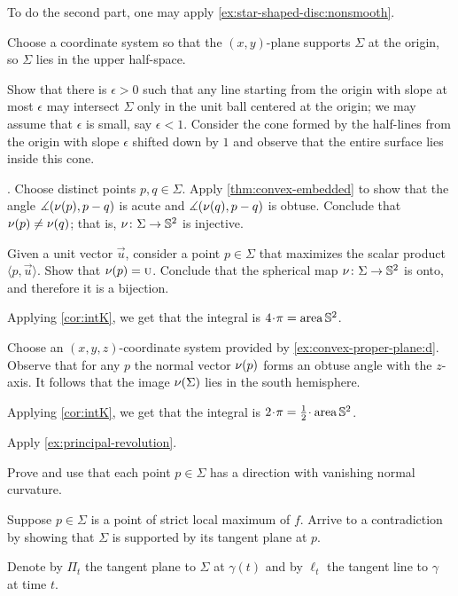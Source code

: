 To do the second part, one may apply \ref{ex:star-shaped-disc:nonsmooth}.


Choose a coordinate system so that the $(x,y)$-plane supports $\Sigma$ at the origin, so $\Sigma$ lies in the upper half-space.

Show that there is $\epsilon>0$ such that any line starting from the origin with slope at most $\epsilon$ may intersect $\Sigma$ only in the unit ball centered at the origin;
we may assume that $\epsilon$ is small, say $\epsilon<1$.
Consider the cone formed by the half-lines from the origin with slope $\epsilon$ shifted down by $1$ and observe that the entire surface lies inside this cone.



\parbf{\ref{ex:intK}}.
Choose distinct points $p,q\in\Sigma$.
Apply \ref{thm:convex-embedded} to show that the angle 
$\measuredangle(\nu(p),p-q)$ is acute and $\measuredangle(\nu(q),p-q)$ is obtuse.
Conclude that $\nu(p)\ne\nu(q)$;
that is, $\nu\colon\Sigma\to\mathbb{S}^2$ is injective.


Given a unit vector $\vec u$, consider a point $p\in \Sigma$ that maximizes the scalar product $\langle p,\vec u\rangle$.
Show that $\nu(p)=\text{\sc{u}}$.
Conclude that the spherical map $\nu\colon\Sigma\to\mathbb{S}^2$ is onto, and therefore it is a bijection.

Applying \ref{cor:intK}, we get that the integral is $4\cdot\pi=\area\mathbb{S}^2$.

 Choose an $(x,y,z)$-coordinate system provided by \ref{ex:convex-proper-plane:d}.
Observe that for any $p$ the normal vector $\nu(p)$ forms an obtuse angle with the $z$-axis.
It follows that the image $\nu(\Sigma)$ lies in the south hemisphere.

Applying \ref{cor:intK}, we get that the integral is $2\cdot\pi=\tfrac12\cdot\area\mathbb{S}^2$.

Apply \ref{ex:principal-revolution}.

 Prove and use that each point $p\in\Sigma$ has a direction with vanishing normal curvature.

 Suppose $p\in \Sigma$ is a point of strict  local maximum of $f$.
Arrive to a contradiction by showing that $\Sigma$ is supported by its tangent plane at $p$.


 Denote by $\Pi_t$ the tangent plane to $\Sigma$ at $\gamma(t)$ and by $\ell_t$ the tangent line to $\gamma$ at time $t$.

